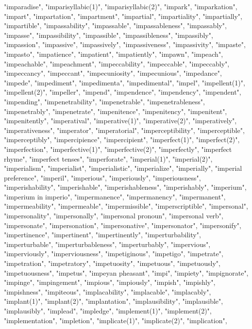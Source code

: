 "imparadise",
"imparisyllabic(1)",
"imparisyllabic(2)",
"impark",
"imparkation",
"impart",
"impartation",
"impartment",
"impartial",
"impartiality",
"impartially",
"impartible",
"impassability",
"impassable",
"impassableness",
"impassably",
"impasse",
"impassibility",
"impassible",
"impassibleness",
"impassibly",
"impassion",
"impassive",
"impassively",
"impassiveness",
"impassivity",
"impaste",
"impasto",
"impatience",
"impatient",
"impatiently",
"impawn",
"impeach",
"impeachable",
"impeachment",
"impeccability",
"impeccable",
"impeccably",
"impeccancy",
"impeccant",
"impecuniosity",
"impecunious",
"impedance",
"impede",
"impediment",
"impedimenta",
"impedimental",
"impel",
"impellent(1)",
"impellent(2)",
"impeller",
"impend",
"impendence",
"impendency",
"impendent",
"impending",
"impenetrability",
"impenetrable",
"impenetrableness",
"impenetrably",
"impenetrate",
"impenitence",
"impenitency",
"impenitent",
"impenitently",
"imperatival",
"imperative(1)",
"imperative(2)",
"imperatively",
"imperativeness",
"imperator",
"imperatorial",
"imperceptibility",
"imperceptible",
"imperceptibly",
"impercipience",
"impercipient",
"imperfect(1)",
"imperfect(2)",
"imperfection",
"imperfective(1)",
"imperfective(2)",
"imperfectly",
"imperfect rhyme",
"imperfect tenses",
"imperforate",
"imperial(1)",
"imperial(2)",
"imperialism",
"imperialist",
"imperialistic",
"imperialize",
"imperially",
"imperial preference",
"imperil",
"imperious",
"imperiously",
"imperiousness",
"imperishability",
"imperishable",
"imperishableness",
"imperishably",
"imperium",
"imperium in imperio",
"impermanence",
"impermanency",
"impermanent",
"impermeability",
"impermeable",
"impermissible",
"imperscriptible",
"impersonal",
"impersonality",
"impersonally",
"impersonal pronoun",
"impersonal verb",
"impersonate",
"impersonation",
"impersonative",
"impersonator",
"impersonify",
"impertinence",
"impertinent",
"impertinently",
"imperturbability",
"imperturbable",
"imperturbableness",
"imperturbably",
"impervious",
"imperviously",
"imperviousness",
"impetiginous",
"impetigo",
"impetrate",
"impetration",
"impetratory",
"impetuosity",
"impetuous",
"impetuously",
"impetuousness",
"impetus",
"impeyan pheasant",
"impi",
"impiety",
"impignorate",
"impinge",
"impingement",
"impious",
"impiously",
"impish",
"impishly",
"impishness",
"impiteous",
"implacability",
"implacable",
"implacably",
"implant(1)",
"implant(2)",
"implantation",
"implausibility",
"implausible",
"implausibly",
"implead",
"impledge",
"implement(1)",
"implement(2)",
"implementation",
"impletion",
"implicate(1)",
"implicate(2)",
"implication",
